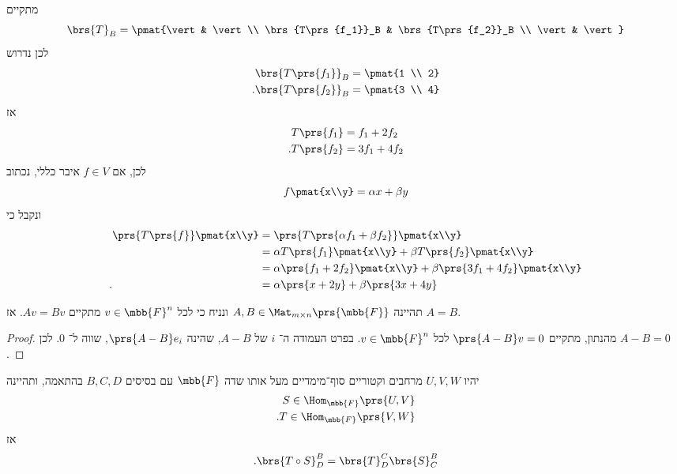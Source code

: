 \documentclass[a4paper,10pt,twoside,openany]{book}
\begin{document}
\begin{solution}
מתקיים
\[\brs{T}_B = \pmat{\vert & \vert \\ \brs{T\prs{f_1}}_B & \brs{T\prs{f_2}}_B \\ \vert & \vert}\]
לכן נדרוש
\begin{align*}
\brs{T\prs{f_1}}_B &= \pmat{1 \\ 2} \\
\text{.} \brs{T\prs{f_2}}_B &= \pmat{3 \\ 4}
\end{align*}
אז
\begin{align*}
T\prs{f_1} &= f_1 + 2 f_2 \\
\text{.} T\prs{f_2} &= 3 f_1 + 4 f_2
\end{align*}
לכן, אם
$f \in V$
איבר כללי, נכתוב
\[f\pmat{x\\y} = \alpha x + \beta y\]
ונקבל כי
\begin{align*}
\prs{T\prs{f}}\pmat{x\\y} &= \prs{T\prs{\alpha f_1 + \beta f_2}}\pmat{x\\y}
\\&= \alpha T\prs{f_1}\pmat{x\\y} + \beta T\prs{f_2} \pmat{x\\y}
\\&= \alpha \prs{f_1 + 2 f_2}\pmat{x\\y} + \beta \prs{3 f_1 + 4 f_2} \pmat{x\\y}
\\ \text{.} \hphantom{\prs{T\prs{f}}\pmat{x\\y}} &= \alpha \prs{x + 2 y} + \beta \prs{3 x + 4y}
\end{align*}
\end{solution}

\begin{proposition}
תהיינה
$A,B \in \Mat_{m \times n}\prs{\mbb{F}}$
ונניח כי לכל
$v \in \mbb{F}^n$
מתקיים
$Av = Bv$.
אז
$A = B$.
\end{proposition}

\begin{proof}
מהנתון, מתקיים
$\prs{A - B}v = 0$
לכל
$v \in \mbb{F}^n$.
בפרט העמודה ה־%
$i$
של
$A-B$,
שהינה
$\prs{A - B}e_i$,
שווה ל־%
$0$.
לכן
$A - B = 0$.
\end{proof}

\begin{proposition}
יהיו
$U,V,W$
מרחבים וקטוריים סוף־מימדיים מעל אותו שדה
$\mbb{F}$
עם בסיסים
$B,C,D$
בהתאמה,
ותהיינה
\begin{align*}
S \in \Hom_{\mbb{F}}\prs{U,V} \\
\text{.} T \in \Hom_{\mbb{F}}\prs{V,W}
\end{align*}
אז
\[\text{.} \brs{T \circ S}^B_D = \brs{T}^C_D \brs{S}^B_C\]
\end{proposition}
\end{document}
